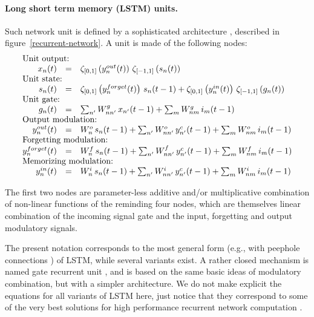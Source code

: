 \paragraph{Long short term memory (LSTM) units.} 

Such network unit is defined by a sophisticated architecture \cite{Hochreiter:1997}, described in figure~\ref{recurrent-network}. A unit is made of the following nodes:
\begin{equation}\label{lstm-network}
\begin{array}{rcl}
\multicolumn{3}{l}{\mbox{Unit output:}} \\
x_n(t) &=& \zeta_{[0,1]}\left(y_n^{out}(t)\right) \, \zeta_{[-1,1]}\left(s_n(t)\right) \\
\multicolumn{3}{l}{\mbox{Unit state:}} \\
s_n(t) &=& \zeta_{[0,1]}\left(y_n^{forget}(t)\right) \, s_n(t-1) + 
          \zeta_{[0,1]}\left(y_n^{in}(t)\right) \, \zeta_{[-1,1]}\left(g_n(t)\right) \\
\multicolumn{3}{l}{\mbox{Unit gate:}} \\
g_n(t) &=& \sum_{n'} W^g_{nn'} \, x_{n'}(t-1) + \sum_{m} W^g_{nm} \, i_m(t-1) \\
\multicolumn{3}{l}{\mbox{Output modulation:}} \\
y_n^{out}(t) &=& W^o_n \, s_n(t-1) + \sum_{n'} W^o_{nn'} \, y_{n'}^c(t-1) + \sum_{m} W^o_{nm} \, i_m(t-1) \\
\multicolumn{3}{l}{\mbox{Forgetting modulation:}} \\
y_n^{forget}(t) &=& W^f_n \, s_n(t-1) + \sum_{n'} W^f_{nn'} \, y_{n'}^c(t-1) + \sum_{m} W^f_{nm} \, i_m(t-1) \\
\multicolumn{3}{l}{\mbox{Memorizing modulation:}} \\
y_n^{in}(t) &=& W^i_n \, s_n(t-1) + \sum_{n'} W^i_{nn'} \, y_{n'}^c(t-1) + \sum_{m} W^i_{nm} \, i_m(t-1)  \\
\end{array}\end{equation}

The first two nodes are parameter-less additive and/or multiplicative combination of non-linear functions of the reminding four nodes, which are themselves linear combination of the incoming signal gate and the input, forgetting and output modulatory signals. 

The present notation corresponds to the most general form (e.g., with peephole connections \cite{Gers:2003}) of LSTM, while several variants exist. A rather closed mechanism is named gate recurrent unit \cite{Cho-2014}, and is based on the same basic ideas of modulatory combination, but with a simpler architecture. We do not make explicit the equations for all variants of LSTM here, just notice that they correspond to some of the very best solutions for high performance recurrent network computation \cite{Schmidhuber:2015}.

